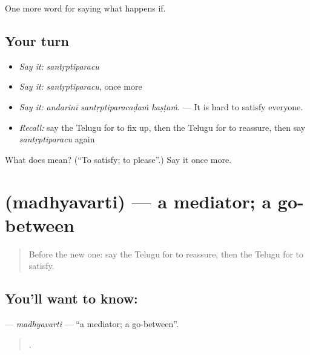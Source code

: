 \begin{grammarlens}[title={What you've built}]
One more word for saying what happens if.
\end{grammarlens}

\subsection*{Your turn}
\begin{itemize}
\raggedright
  \item \emph{Say it:} \emph{santṛptiparacu}
  \item \emph{Say it:} \emph{santṛptiparacu}, once more
  \item \emph{Say it:} \emph{andarinī santṛptiparacaḍaṁ kaṣṭaṁ.} — It is hard to satisfy everyone.
  \item \emph{Recall:} say the Telugu for to fix up, then the Telugu for to reassure, then say \emph{santṛptiparacu} again
\end{itemize}

\begin{tcolorbox}[breakable,colback=teal!4,colframe=teal!35!black,title={Before you move on}]
What does  mean? (\textquotedblleft{}To satisfy; to please\textquotedblright{}.) Say it once more.
\end{tcolorbox}
\section[\texorpdfstring{\te{మధ్యవర్తి} (madhyavarti)}{మధ్యవర్తి (madhyavarti)}]{ (madhyavarti) — a mediator; a go-between}

\label{lesson:TE-C427-madhyavarti}



\begin{quote}
Before the new one: say the Telugu for to reassure, then the Telugu for to satisfy.
\end{quote}

\subsection*{You'll want to know: }
\textbf{} — \emph{madhyavarti} — \textquotedblleft{}a mediator; a go-between\textquotedblright{}.

\begin{quote}
     .
\end{quote}

